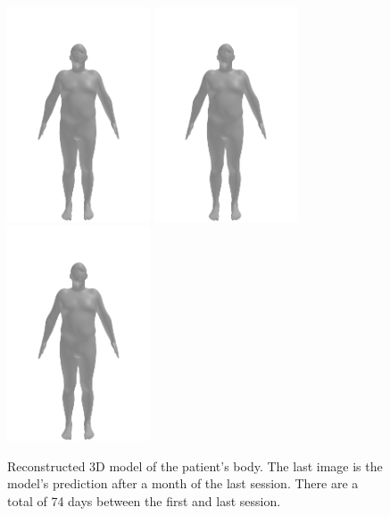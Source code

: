 \begin{figure}[h]
    \includegraphics[width=120pt]{files/patient_2/2_10}
    \includegraphics[width=120pt]{files/patient_2/2_11}
    \linebreak
    \includegraphics[width=120pt]{files/patient_2/2_predicted}
    \caption[Reconstructed 3D model of the patient's body]{Reconstructed 3D
        model of the patient's body. The last image is the model's prediction after a month of
        the last session. There are a total of 74 days between the first and last session.}
\end{figure}
